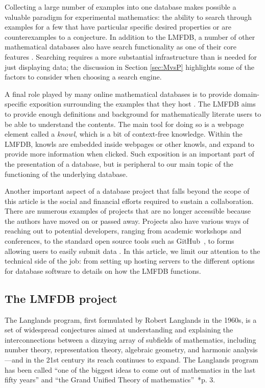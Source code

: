 \documentclass{amsart}
\begin{document}
Collecting a large number of examples into one database makes possible a valuable paradigm for experimental mathematics: the ability to search through examples for a few that have particular specific desired properties or are counterexamples to a conjecture.
In addition to the LMFDB, a number of other mathematical databases also have search functionality as one of their core features .
Searching requires a more substantial infrastructure than is needed for just displaying data; the discussion in Section \ref{sec:MvsP} highlights some of the factors to consider when choosing a search engine.

A final role played by many online mathematical databases is to provide domain-specific exposition surrounding the examples that they host .
The LMFDB aims to provide enough definitions and background for mathematically literate users to be able to understand the contents.
The main tool for doing so is a webpage element called a \emph{knowl}, which is a bit of context-free knowledge.
Within the LMFDB, knowls are embedded inside webpages or other knowls, and expand to provide more information when clicked.
Such exposition is an important part of the presentation of a database, but is peripheral to our main topic of the functioning of the underlying database.

Another important aspect of a database project that falls beyond the scope of this article is the social and financial efforts required to sustain a collaboration.
There are numerous examples of projects that are no longer accessible because the authors have moved on or passed away.
Projects also have various ways of reaching out to potential developers, ranging from academic workshops and conferences, to the standard open source tools such as GitHub~\cite{github}, to forms allowing users to easily submit data .
In this article, we limit our attention to the technical side of the job: from setting up hosting servers to the different options for database software to details on how the LMFDB functions.

\subsection{The LMFDB project}
The Langlands program, first formulated by Robert Langlands in the 1960s, is a set of widespread conjectures aimed at understanding and explaining the interconnections between a dizzying array of subfields of mathematics, including number theory, representation theory, algebraic geometry, and harmonic analysis---and in the 21st century its reach continues to expand.
The Langlands program has been called ``one of the biggest ideas to come out of mathematics in the last fifty years'' and ``the Grand Unified Theory of mathematics''~\cite{frenkel}*{p. 3}.
\end{document}
